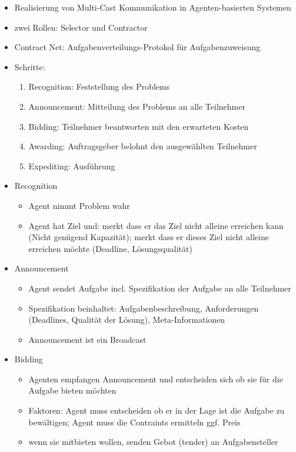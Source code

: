 \documentclass{article} %
\begin{document}
	\begin{itemize}
		\item Realisierung von Multi-Cast Kommunikation in Agenten-basierten Systemen
		\item zwei Rollen: Selector und Contractor
		\item Contract Net: Aufgabenverteilungs-Protokol für Aufgabenzuweisung
		\item Schritte:
		\begin{enumerate}
			\item Recognition: Feststellung des Problems
			\item Announcement: Mitteilung des Problems an alle Teilnehmer
			\item Bidding: Teilnehmer beantworten mit den erwarteten Kosten
			\item Awarding: Auftragsgeber belohnt den ausgewählten Teilnehmer
			\item Expediting: Ausführung
		\end{enumerate}
		\item Recognition
		\begin{itemize}
			\item Agent nimmt Problem wahr
			\item Agent hat Ziel und: merkt dass er das Ziel nicht alleine erreichen kann (Nicht genügend Kapazität); merkt dass er dieses Ziel nicht alleine erreichen möchte (Deadline, Lösungsqualität)
		\end{itemize}
		\item Announcement
		\begin{itemize}
			\item Agent sendet Aufgabe incl. Spezifikation der Aufgabe an alle Teilnehmer
			\item Spezifikation beinhaltet: Aufgabenbeschreibung, Anforderungen (Deadlines, Qualität der Lösung), Meta-Informationen
			\item Announcement ist ein Broadcast
		\end{itemize}
		\item Bidding
		\begin{itemize}
			\item Agenten empfangen Announcement und entscheiden sich ob sie für die Aufgabe bieten möchten
			\item Faktoren: Agent muss entscheiden ob er in der Lage ist die Aufgabe zu bewältigen; Agent muss die Contraints ermitteln ggf. Preis
			\item wenn sie mitbieten wollen, senden Gebot (tender) an Aufgabensteller

\end{itemize}
\end{itemize}
\end{document}
